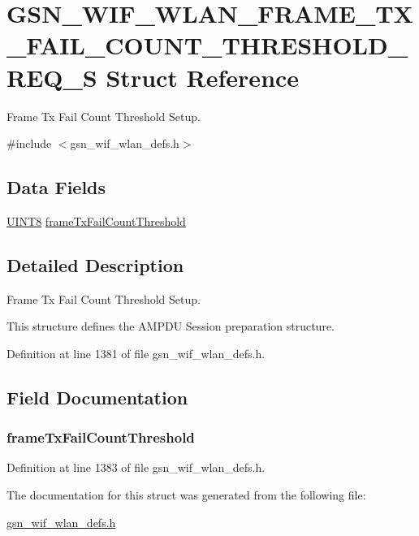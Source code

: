 \hypertarget{a00381}{
\section{GSN\_\-WIF\_\-WLAN\_\-FRAME\_\-TX\_\-FAIL\_\-COUNT\_\-THRESHOLD\_\-REQ\_\-S Struct Reference}
\label{a00381}
}


Frame Tx Fail Count Threshold Setup.  




{\ttfamily \#include $<$gsn\_\-wif\_\-wlan\_\-defs.h$>$}

\subsection*{Data Fields}
\begin{DoxyCompactItemize}
\item 
\hyperlink{a00660_gab27e9918b538ce9d8ca692479b375b6a}{UINT8} \hyperlink{a00381_a3559e3bd06924269e36b8e19d554d2c1}{frameTxFailCountThreshold}
\end{DoxyCompactItemize}


\subsection{Detailed Description}
Frame Tx Fail Count Threshold Setup. 

This structure defines the AMPDU Session preparation structure. 

Definition at line 1381 of file gsn\_\-wif\_\-wlan\_\-defs.h.



\subsection{Field Documentation}
\hypertarget{a00381_a3559e3bd06924269e36b8e19d554d2c1}{
\subsubsection[{frameTxFailCountThreshold}]{ {\bf frameTxFailCountThreshold}}}
\label{a00381_a3559e3bd06924269e36b8e19d554d2c1}


Definition at line 1383 of file gsn\_\-wif\_\-wlan\_\-defs.h.



The documentation for this struct was generated from the following file:\begin{DoxyCompactItemize}
\item 
\hyperlink{a00613}{gsn\_\-wif\_\-wlan\_\-defs.h}\end{DoxyCompactItemize}
